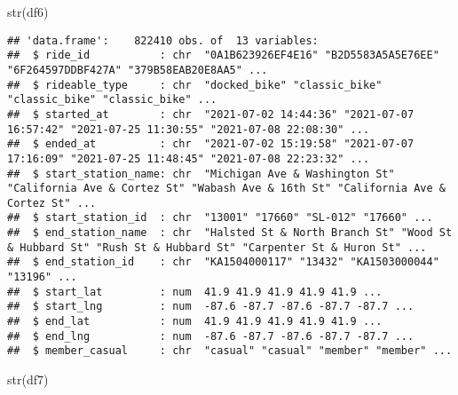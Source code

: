 \documentclass[
]{article}
\newenvironment{Shaded}{\begin{snugshade}}{\end{snugshade}}
\newcommand{\FunctionTok}[1]{\textcolor[rgb]{0.00,0.00,0.00}{#1}}
\newcommand{\NormalTok}[1]{#1}
\begin{document}
\begin{Shaded}
\begin{Highlighting}[]
\FunctionTok{str}\NormalTok{(df6)}
\end{Highlighting}
\end{Shaded}

\begin{verbatim}
## 'data.frame':    822410 obs. of  13 variables:
##  $ ride_id           : chr  "0A1B623926EF4E16" "B2D5583A5A5E76EE" "6F264597DDBF427A" "379B58EAB20E8AA5" ...
##  $ rideable_type     : chr  "docked_bike" "classic_bike" "classic_bike" "classic_bike" ...
##  $ started_at        : chr  "2021-07-02 14:44:36" "2021-07-07 16:57:42" "2021-07-25 11:30:55" "2021-07-08 22:08:30" ...
##  $ ended_at          : chr  "2021-07-02 15:19:58" "2021-07-07 17:16:09" "2021-07-25 11:48:45" "2021-07-08 22:23:32" ...
##  $ start_station_name: chr  "Michigan Ave & Washington St" "California Ave & Cortez St" "Wabash Ave & 16th St" "California Ave & Cortez St" ...
##  $ start_station_id  : chr  "13001" "17660" "SL-012" "17660" ...
##  $ end_station_name  : chr  "Halsted St & North Branch St" "Wood St & Hubbard St" "Rush St & Hubbard St" "Carpenter St & Huron St" ...
##  $ end_station_id    : chr  "KA1504000117" "13432" "KA1503000044" "13196" ...
##  $ start_lat         : num  41.9 41.9 41.9 41.9 41.9 ...
##  $ start_lng         : num  -87.6 -87.7 -87.6 -87.7 -87.7 ...
##  $ end_lat           : num  41.9 41.9 41.9 41.9 41.9 ...
##  $ end_lng           : num  -87.6 -87.7 -87.6 -87.7 -87.7 ...
##  $ member_casual     : chr  "casual" "casual" "member" "member" ...
\end{verbatim}

\begin{Shaded}
\begin{Highlighting}[]
\FunctionTok{str}\NormalTok{(df7)}
\end{Highlighting}
\end{Shaded}
\end{document}
